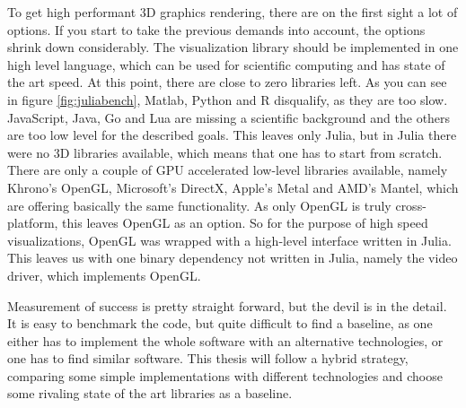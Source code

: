 To get high performant 3D graphics rendering, there are on the first sight a lot of options.
If you start to take the previous demands into account, the options shrink down considerably.
The visualization library should be implemented in one high level language, which can be used for scientific computing and has state of the art speed. 
At this point, there are close to zero libraries left. As you can see in figure \ref{fig:juliabench}, Matlab, Python and R disqualify, as they are too slow. JavaScript, Java, Go and Lua are missing a scientific background and the others are too low level for the described goals.
This leaves only Julia, but in Julia there were no 3D libraries available, which means that one has to start from scratch.
There are only a couple of GPU accelerated low-level libraries available, namely Khrono's \ac{OpenGL}, Microsoft's DirectX, Apple's Metal and AMD's Mantel, which are offering basically the same functionality. 
As only \ac{OpenGL} is truly cross-platform, this leaves \ac{OpenGL} as an option.
So for the purpose of high speed visualizations, \ac{OpenGL} was wrapped with a high-level interface written in Julia. This leaves us with one binary dependency not written in Julia, namely the video driver, which implements \ac{OpenGL}.

Measurement of success is pretty straight forward, but the devil is in the detail.
It is easy to benchmark the code, but quite difficult to find a baseline, as one either has to implement the whole software with an alternative technologies, or one has to find similar software.
This thesis will follow a hybrid strategy, comparing some simple implementations with different technologies and choose some rivaling state of the art libraries as a baseline.

